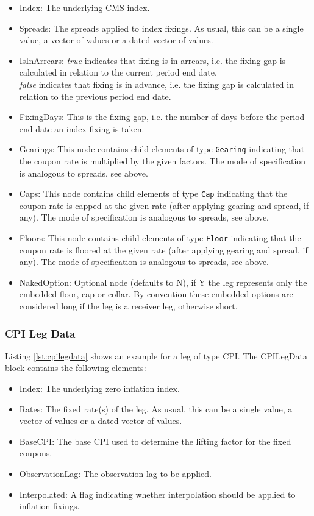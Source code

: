 \begin{itemize}
\item Index: The underlying CMS index.
\item Spreads: The spreads applied to index fixings. As usual, this can be a single value, a vector of values or a dated vector of
  values.
\item IsInArrears:  \emph{true} indicates that  fixing is in arrears,
  i.e. the fixing gap is calculated in relation to the current period
  end date.\\ \emph{false} indicates that  fixing is in advance,
  i.e. the fixing gap is calculated in relation to the previous period
  end date.  
\item FixingDays: This is the fixing gap, i.e. the number of days
  before the period end date an index fixing is taken.   
\item Gearings: This node contains child elements of type \lstinline!Gearing! indicating that the coupon rate is
  multiplied by the given factors. The mode of specification is analogous to spreads, see above.
\item Caps: This node contains child elements of type \lstinline!Cap! indicating that the coupon rate is capped at the
  given rate (after applying gearing and spread, if any). The mode of specification is analogous to spreads, see above.
\item Floors: This node contains child elements of type \lstinline!Floor! indicating that the coupon rate is floored at
  the given rate (after applying gearing and spread, if any). The mode of specification is analogous to spreads, see
  above.
\item NakedOption: Optional node (defaults to N), if Y the leg represents only the embedded floor, cap or collar. 
By convention these embedded options are considered long if the leg is a receiver leg, otherwise short. 
\end{itemize}

\subsubsection{CPI Leg Data}
\label{ss:cpilegdata}

Listing \ref{lst:cpilegdata} shows an example for a leg of type CPI. The CPILegData block contains the following
elements:

\begin{itemize}
\item Index: The underlying zero inflation index.
\item Rates: The fixed rate(s) of the leg. As usual, this can be a single value, a vector of values or a dated vector of
  values.
\item BaseCPI: The base CPI used to determine the lifting factor for the fixed coupons.
\item ObservationLag: The observation lag to be applied.
\item Interpolated: A flag indicating whether interpolation should be applied to inflation fixings.
\end{itemize}

